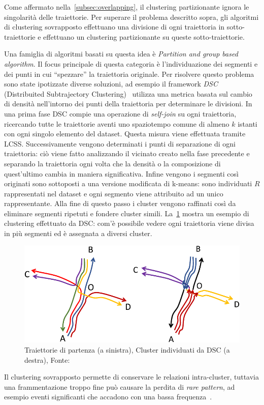 Come affermato nella~\cref{subsec:overlapping}, il clustering partizionante ignora le singolarità delle traiettorie.
Per superare il problema descritto sopra, gli algoritmi di clustering sovrapposto effettuano una divisione di ogni traiettoria
in sotto-traiettorie e effettuano un clustering partizionante su queste sotto-traiettorie.

Una famiglia di algoritmi basati su questa idea è \textit{Partition and group based algorithm}.
Il focus principale di questa categoria è l'individuazione dei segmenti e
dei punti in cui ``spezzare'' la traiettoria originale.
Per risolvere questo problema sono state ipotizzate diverse soluzioni,
ad esempio il framework \textit{DSC} (Distribuited Subtrajectory Clustering)~\cite{tampakis2019scalable} utilizza una metrica basata
sul cambio di densità nell'intorno dei punti della traiettoria per determinare le divisioni.
In una prima fase DSC compie una operazione di \textit{self-join} su ogni traiettoria, ricercando tutte le traiettorie aventi uno spaziotempo comune di almeno \(k\) istanti con ogni singolo elemento del dataset.
Questa misura viene effettuata tramite LCSS.
Successivamente vengono determinati i punti di separazione di ogni traiettoria: ciò viene fatto analizzando il vicinato creato nella fase precedente e separando la traiettoria ogni volta che la densità o la composizione di quest'ultimo cambia in maniera significativa.
Infine vengono i segmenti così originati sono sottoposti a una versione modificata di k-means: sono individuati \(R\) rappresentati nel dataset e ogni segmento viene attribuito ad un unico rappresentante.
Alla fine di questo passo i cluster vengono raffinati così da eliminare segmenti ripetuti e fondere cluster simili.
La~\cref{fig:chap-1:dsc} mostra un esempio di clustering effettuato da DSC: com'è possibile vedere
ogni traiettoria viene divisa in più segmenti ed è assegnata a diversi cluster.

\begin{figure}
\centering
  \includegraphics[scale=.8]{res/fig/sec-1/DSCDataset.pdf}
  \caption{Traiettorie di partenza (a sinistra), Cluster individuati da DSC (a destra), Fonte:~\cite{tampakis2019scalable} }%
  \label{fig:chap-1:dsc}
\end{figure}    


Il clustering sovrapposto permette di conservare le relazioni intra-cluster, tuttavia una frammentazione troppo fine può causare
la perdita di \textit{rare pattern}, ad esempio eventi significanti che accadono con una bassa frequenza~\cite{DBLP:journals/tkdd/KohR16, DBLP:journals/geoinformatica/HuangPX06}.